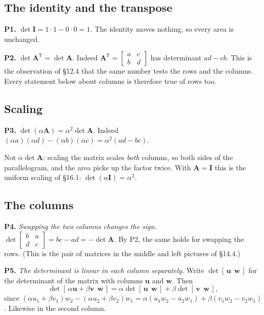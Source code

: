 \documentclass[11pt]{article}
\theoremstyle{plain}
\theoremstyle{definition}
\theoremstyle{remark}
\newcommand{\vc}[1]{\mathbf{#1}}
\newcommand{\mt}[1]{\mathbf{#1}}
\newcommand{\T}{^{\mathsf{T}}}
\begin{document}
\subsection{The identity and the transpose}
\textbf{P1.} $\det\mt{I}=1\cdot1-0\cdot0=1$. The identity moves nothing, so
every area is unchanged.

\textbf{P2.} $\det\mt{A}\T=\det\mt{A}$. Indeed
$\mt{A}\T=\begin{bmatrix}a&c\\b&d\end{bmatrix}$ has determinant $ad-cb$. This
is the observation of \S12.4 that the same number tests the rows and the
columns. Every statement below about columns is therefore true of rows too.

\subsection{Scaling}
\textbf{P3.} $\det(\alpha\mt{A})=\alpha^{2}\det\mt{A}$. Indeed
$(\alpha a)(\alpha d)-(\alpha b)(\alpha c)=\alpha^{2}(ad-bc)$.

\noindent Not $\alpha\det\mt{A}$: scaling the matrix scales \emph{both}
columns, so both sides of the parallelogram, and the area picks up the factor
twice. With $\mt{A}=\mt{I}$ this is the uniform scaling of \S16.1:
$\det(\alpha\mt{I})=\alpha^{2}$.

\subsection{The columns}
\textbf{P4.} \emph{Swapping the two columns changes the sign.}
$\det\begin{bmatrix}b&a\\d&c\end{bmatrix}=bc-ad=-\det\mt{A}$. By P2, the same
holds for swapping the rows. (This is the pair of matrices in the middle and left
pictures of \S14.4.)

\textbf{P5.} \emph{The determinant is linear in each column separately.} Write
$\det[\,\vc{u}\ \ \vc{w}\,]$ for the determinant of the matrix with columns
$\vc{u}$ and $\vc{w}$. Then
\[
  \det[\,\alpha\vc{u}+\beta\vc{v}\ \ \vc{w}\,]
  =\alpha\det[\,\vc{u}\ \ \vc{w}\,]+\beta\det[\,\vc{v}\ \ \vc{w}\,] ,
\]
since
$(\alpha u_1+\beta v_1)w_2-(\alpha u_2+\beta v_2)w_1
 =\alpha(u_1w_2-u_2w_1)+\beta(v_1w_2-v_2w_1)$. Likewise in the second column.
\end{document}
